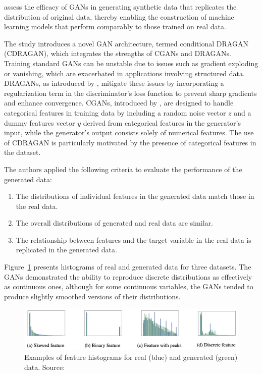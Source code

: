 \documentclass[12pt]{article}
\begin{document}
\cite{efimovUsingGenerativeAdversarial2020} assess the efficacy of GANs in generating synthetic data that replicates the distribution of original data, thereby enabling the construction of machine learning models that perform comparably to those trained on real data.

The study introduces a novel GAN architecture, termed conditional DRAGAN
(CDRAGAN), which integrates the strengths of CGANs and DRAGANs. Training
standard GANs can be unstable due to issues such as gradient exploding or
vanishing, which are exacerbated in applications involving structured data.
DRAGANs, as introduced by \cite{kodali2017convergence}, mitigate these issues
by incorporating a regularization term in the discriminator's loss function to
prevent sharp gradients and enhance convergence. CGANs, introduced by
\cite{mirza2014conditional}, are designed to handle categorical features in
training data by including a random noise vector \(z\) and a dummy features
vector \(y\) derived from categorical features in the generator's input, while
the generator's output consists solely of numerical features. The use of
CDRAGAN is particularly motivated by the presence of categorical features in
the dataset.

The authors applied the following criteria to evaluate the performance of the
generated data:
\begin{enumerate}
    \item The distributions of individual features in the generated data match those in
          the real data.
    \item The overall distributions of generated and real data are similar.
    \item The relationship between features and the target variable in the real data is
          replicated in the generated data.
\end{enumerate}

Figure~\ref{fig:ganfinance} presents histograms of real and generated data for
three datasets. The GANs demonstrated the ability to reproduce discrete
distributions as effectively as continuous ones, although for some continuous
variables, the GANs tended to produce slightly smoothed versions of their
distributions.

\begin{figure}[!htbp]
    \centering
    \includegraphics[width=\textwidth]{../Figures/Figure4.png}
    \caption{Examples of feature histograms for real (blue) and generated (green) data. Source: \cite{efimovUsingGenerativeAdversarial2020}}
    \label{fig:ganfinance}
\end{figure}
\end{document}
